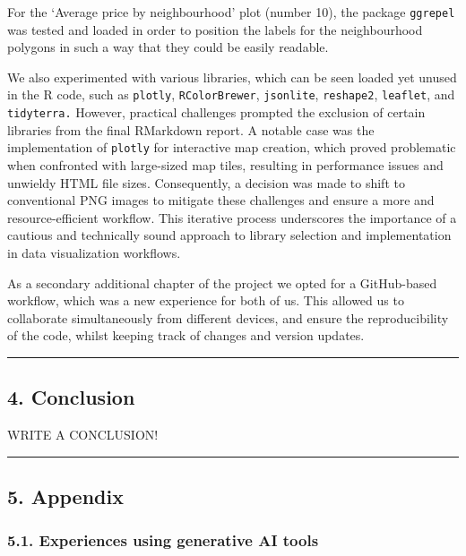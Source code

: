 \documentclass[
]{article}
\begin{document}
For the `Average price by neighbourhood' plot (number 10), the package
\texttt{ggrepel} was tested and loaded in order to position the labels
for the neighbourhood polygons in such a way that they could be easily
readable.

We also experimented with various libraries, which can be seen loaded
yet unused in the R code, such as \texttt{plotly},
\texttt{RColorBrewer}, \texttt{jsonlite}, \texttt{reshape2},
\texttt{leaflet}, and \texttt{tidyterra.} However, practical challenges
prompted the exclusion of certain libraries from the final RMarkdown
report. A notable case was the implementation of \texttt{plotly} for
interactive map creation, which proved problematic when confronted with
large-sized map tiles, resulting in performance issues and unwieldy HTML
file sizes. Consequently, a decision was made to shift to conventional
PNG images to mitigate these challenges and ensure a more and
resource-efficient workflow. This iterative process underscores the
importance of a cautious and technically sound approach to library
selection and implementation in data visualization workflows.

As a secondary additional chapter of the project we opted for a
GitHub-based workflow, which was a new experience for both of us. This
allowed us to collaborate simultaneously from different devices, and
ensure the reproducibility of the code, whilst keeping track of changes
and version updates.

\begin{center}\rule{0.5\linewidth}{0.5pt}\end{center}

\hypertarget{conclusion}{%
\subsection{4. Conclusion}\label{conclusion}}

WRITE A CONCLUSION!

\begin{center}\rule{0.5\linewidth}{0.5pt}\end{center}

\hypertarget{appendix}{%
\subsection{5. Appendix}\label{appendix}}

\hypertarget{experiences-using-generative-ai-tools}{%
\subsubsection{5.1. Experiences using generative AI
tools}\label{experiences-using-generative-ai-tools}}
\end{document}
